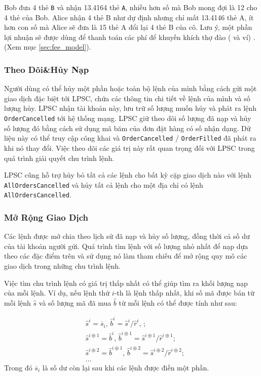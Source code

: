 \documentclass{article}
\begin{document}
\begin{multicols}{2}
Bob đưa 4 thẻ \verb|B| và nhận 13.4164 thẻ \verb|A|, nhiều hơn số mà Bob mong đợi là 12 cho 4 thẻ của Bob. Alice nhận 4 thẻ B như dự định nhưng chỉ  mất 13.4146 thẻ A, ít hơn con số mà Alice sẽ đưa là 15 thẻ A đổi lại 4 thẻ B của cô. Lưu ý, một phần lợi nhuận sẽ được dùng để thanh toán các phí để  khuyến khích thợ đào ( và ví) . (Xem mục \ref{sec:fee_model}).


\subsubsection{Theo Dõi\&Hủy Nạp}

Người dùng có thể hủy một phần hoặc toàn bộ lệnh của mình bằng cách gửi một giao dịch đặc biệt tới LPSC, chứa các thông tin chi tiết về lệnh của mình và số lượng hủy. LPSC nhận tài khoản này, lưu trữ số lượng muốn hủy và phát ra lệnh \verb|OrderCancelled| tới hệ thống mạng. LPSC giữ theo dõi số lượng đã nạp và hủy số lượng đó bằng cách sử dụng mã băm của đơn đặt hàng có số nhận dạng. Dữ liệu này có thể truy cập công khai và \verb|OrderCancelled| / \verb|OrderFilled| đã phát ra khi nó thay đổi. Việc theo dõi các giá trị này rất quan trọng đối với LPSC trong quá trình giải quyết chu trình lệnh.

LPSC cũng hỗ trợ hủy bỏ tất cả các lệnh cho bất kỳ cặp giao dịch nào với lệnh \verb|AllOrdersCancelled| và hủy tất cả lệnh cho một địa chỉ có lệnh \verb|AllOrdersCancelled|.


\subsubsection{Mở Rộng Giao Dịch\label{sec:order_scaling}}
Các lệnh được mở chia theo lịch sử đã nạp và hủy số lượng, đồng thời cả số dư của tài khoản người gửi. Quá trình tìm lệnh với số lượng nhỏ nhất để nạp dựa theo các đặc điểm trên và sử dụng nó làm tham chiếu để mở rộng quy mô các giao dịch trong những chu trình lệnh.


Việc tìm chu trình lệnh có giá trị thấp nhất có thể giúp tìm ra khối lượng nạp của mỗi lệnh. Ví dụ, nếu lệnh thứ $i$-th là lệnh thấp nhất, khi số mã được bán từ mỗi lệnh $\hat{s}$ và số lượng mã đã mua $\hat{b}$ từ mỗi lệnh có thể được tính như sau:

\[
\begin{split}
&\hat{s}^{i}=\overline{s}_i\text{, } \hat{b}^{i}=\hat{s}^{i}/ \hat{r}^i\text{, }\text{;}\\
&\hat{s}^{i\oplus 1}=\hat{b}^i\text{, } \hat{b}^{i\oplus 1}=\hat{s}^{i\oplus 1}/ \hat{r}^{i\oplus 1}\text{;}\\
&\hat{s}^{i\oplus 2}=\hat{b}^{i\oplus 1}\text{, } \hat{b}^{i\oplus 2}=\hat{s}^{i\oplus 2}/ \hat{r}^{i\oplus 2}\text{;}\\
& ...
\end{split}
\]
Trong đó $\overline{s}_i$ là số dư còn lại sau khi các lệnh được điền một phần.


\end{multicols}
\end{document}
